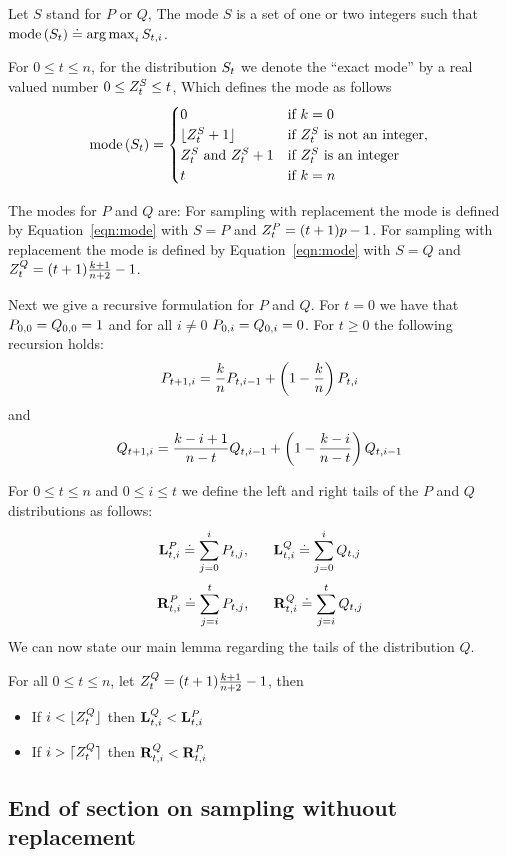 Let $S$ stand for $P$ or $Q$, The mode $S$ is a set of one or two
integers such that  $\mbox{mode}\left(S_{t}\right) \doteq \operatorname*{arg\,max}_{i} S_{t,i}$.
  
  For $0 \leq t \leq n$, for the distribution $S_{t}$ we denote the
  ``exact mode'' by a real valued number $0\leq Z^{S}_t \leq t$,
  Which defines the mode as follows
  \begin{equation}\label{eqn:mode}
    \mbox{mode}\left(S_{t}\right) = \begin{cases}
      0 & \mbox{if $k=0$} \\
    \lfloor Z^{S}_t+1 \rfloor & \mbox{if $Z^{S}_t$ is not
      an integer,} \\
      Z^{S}_t \mbox{ and } Z^{S}_t+1 & \mbox{if $Z^{S}_t$ is an
        integer} \\
    t & \mbox{if $k=n$}
  \end{cases}
  \end{equation}
  
\begin{lemma} The modes for $P$ and $Q$ are:\newline
   For sampling with replacement the mode is defined by
   Equation~\ref{eqn:mode} with $S=P$ and $Z^{P}_t = (t+1)p-1$.\newline
   For sampling with replacement  the mode is defined by
   Equation~\ref{eqn:mode} with $S=Q$ and $Z^{Q}_t = (t+1)\frac{k+1}{n+2}-1$.
\end{lemma}

Next we give a recursive formulation for $P$ and $Q$. \newline
For $t=0$ we have that 
$P_{0,0}=Q_{0,0}=1$ and for all $i\neq 0$
$P_{0,i}=Q_{0,i}=0$.
For $t \geq 0$ the following recursion holds:
\[
P_{t+1,i}=\frac{k}{n} P_{t,i-1} + \left(1-\frac{k}{n}\right)P_{t,i}
\]
and
\[
Q_{t+1,i}=\frac{k-i+1}{n-t}Q_{t,i-1} + \left(1-\frac{k-i}{n-t}\right)Q_{t,i-1}
\]

For $0 \leq t \leq n$ and $0 \leq i \leq t$ we define the left and
right tails of the $P$ and $Q$ distributions as follows:
\[
{\mathbf L}^{P}_{t,i} \doteq \sum_{j=0}^i P_{t,j},\;\;\;\;\;\;
{\mathbf L}^{Q}_{t,i} \doteq \sum_{j=0}^i Q_{t,j}
\]
\[
{\mathbf R}^{P}_{t,i} \doteq \sum_{j=i}^t P_{t,j},\;\;\;\;\;\;
{\mathbf R}^{Q}_{t,i} \doteq \sum_{j=i}^t Q_{t,j}
\]
We can now state our main lemma regarding the tails of the
distribution $Q$.
\begin{lemma}
  For all $0\leq t \leq n$, let $Z^{Q}_t = (t+1)\frac{k+1}{n+2}-1$,
  then 
  \begin{itemize}
    \item If $i < \lfloor Z^{Q}_t \rfloor$ then ${\mathbf L}^{Q}_{t,i} < {\mathbf L}^{P}_{t,i}$
    \item If $i > \lceil Z^{Q}_t \rceil$ then ${\mathbf R}^{Q}_{t,i} < {\mathbf R}^{P}_{t,i}$
    \end{itemize}
\end{lemma}

\subsection{End of section on sampling withuout replacement}

